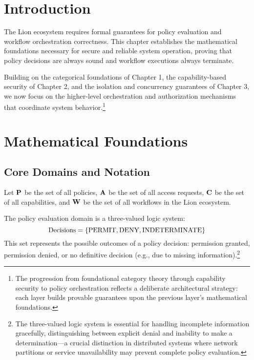 \tableofcontents

\section{Introduction}

The Lion ecosystem requires formal guarantees for policy evaluation and workflow orchestration correctness. This chapter establishes the mathematical foundations necessary for secure and reliable system operation, proving that policy decisions are always sound and workflow executions always terminate.

Building on the categorical foundations of Chapter 1, the capability-based security of Chapter 2, and the isolation and concurrency guarantees of Chapter 3, we now focus on the higher-level orchestration and authorization mechanisms that coordinate system behavior.\footnote{The progression from foundational category theory through capability security to policy orchestration reflects a deliberate architectural strategy: each layer builds provable guarantees upon the previous layer's mathematical foundations.}

\newpage

\section{Mathematical Foundations}

\subsection{Core Domains and Notation}

Let $\mathbf{P}$ be the set of all policies, $\mathbf{A}$ be the set of all access requests, $\mathbf{C}$ be the set of all capabilities, and $\mathbf{W}$ be the set of all workflows in the Lion ecosystem.

\begin{definition}
\label{def:policy-evaluation-domain}
The policy evaluation domain is a three-valued logic system:
\begin{equation}
\text{Decisions} = \{\text{PERMIT}, \text{DENY}, \text{INDETERMINATE}\}
\end{equation}
This set represents the possible outcomes of a policy decision: permission granted, permission denied, or no definitive decision (e.g., due to missing information).\footnote{The three-valued logic system is essential for handling incomplete information gracefully, distinguishing between explicit denial and inability to make a determination—a crucial distinction in distributed systems where network partitions or service unavailability may prevent complete policy evaluation.}
\end{definition}

